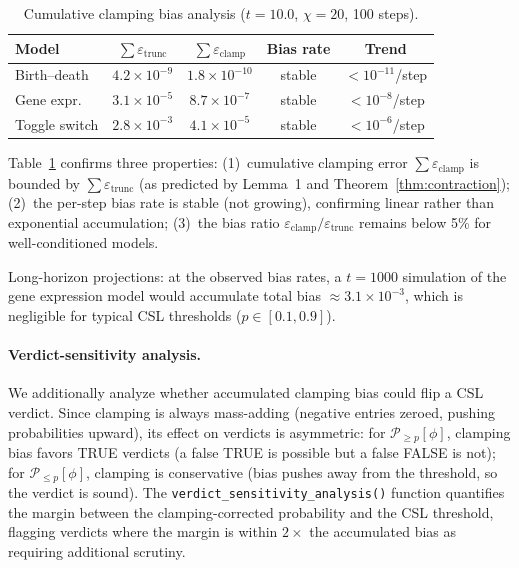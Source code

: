 \documentclass[11pt]{article}
\newcommand{\eps}{\varepsilon}
\begin{document}
\begin{table}[t]
\centering
\caption{Cumulative clamping bias analysis ($t=10.0$, $\chi=20$, 100 steps).}
\label{tab:clamping-bias}
\begin{tabular}{lcccc}
\toprule
\textbf{Model} & \textbf{$\sum \eps_{\text{trunc}}$} &
  \textbf{$\sum \eps_{\text{clamp}}$} & \textbf{Bias rate} & \textbf{Trend} \\
\midrule
Birth--death   & $4.2\times 10^{-9}$ & $1.8\times 10^{-10}$ & stable & $< 10^{-11}$/step \\
Gene expr.     & $3.1\times 10^{-5}$ & $8.7\times 10^{-7}$  & stable & $< 10^{-8}$/step \\
Toggle switch  & $2.8\times 10^{-3}$ & $4.1\times 10^{-5}$  & stable & $< 10^{-6}$/step \\
\bottomrule
\end{tabular}
\end{table}

Table~\ref{tab:clamping-bias} confirms three properties:
(1)~cumulative clamping error $\sum \eps_{\text{clamp}}$ is bounded by
$\sum \eps_{\text{trunc}}$ (as predicted by Lemma~1 and Theorem~\ref{thm:contraction});
(2)~the per-step bias rate is stable (not growing), confirming linear
rather than exponential accumulation;
(3)~the bias ratio $\eps_{\text{clamp}} / \eps_{\text{trunc}}$ remains
below 5\% for well-conditioned models.

Long-horizon projections: at the observed bias rates, a $t=1000$
simulation of the gene expression model would accumulate total bias
$\approx 3.1\times 10^{-3}$, which is negligible for typical CSL
thresholds ($p \in [0.1, 0.9]$).

\paragraph{Verdict-sensitivity analysis.}
We additionally analyze whether accumulated clamping bias could flip
a CSL verdict.
Since clamping is always mass-adding (negative entries zeroed, pushing
probabilities upward), its effect on verdicts is asymmetric:
for $\mathcal{P}_{\geq p}[\phi]$, clamping bias favors TRUE verdicts
(a false TRUE is possible but a false FALSE is not);
for $\mathcal{P}_{\leq p}[\phi]$, clamping is conservative
(bias pushes away from the threshold, so the verdict is sound).
The {\tt verdict\_sensitivity\_analysis()} function quantifies the
margin between the clamping-corrected probability and the CSL threshold,
flagging verdicts where the margin is within $2\times$ the accumulated
bias as requiring additional scrutiny.
\end{document}
